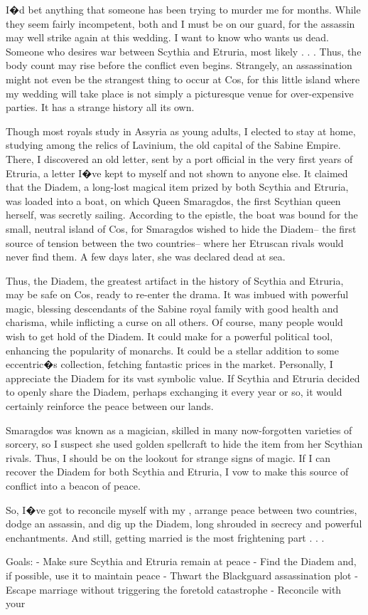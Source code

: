 \documentclass[char]{Kos}
\begin{document}
I�d bet anything that someone has been trying to murder me for months. While they seem fairly incompetent, both \cBride{\nickname} and I must be on our guard, for the assassin may well strike again at this wedding. I want to know who wants us dead. Someone who desires war between Scythia and Etruria, most likely . . . Thus, the body count may rise before the conflict even begins. Strangely, an assassination might not even be the strangest thing to occur at Cos, for this little island where my wedding will take place is not simply a picturesque venue for over-expensive parties. It has a strange history all its own.

Though most royals study in Assyria as young adults, I elected to stay at home, studying among the relics of Lavinium, the old capital of the Sabine Empire. There, I discovered an old letter, sent by a port official in the very first years of Etruria, a letter I�ve kept to myself and not shown to anyone else. It claimed that the Diadem, a long-lost magical item prized by both Scythia and Etruria, was loaded into a boat, on which Queen Smaragdos, the first Scythian queen herself, was secretly sailing. According to the epistle, the boat was bound for the small, neutral island of Cos, for Smaragdos wished to hide the Diadem-- the first source of tension between the two countries-- where her Etruscan rivals would never find them. A few days later, she was declared dead at sea.

Thus, the Diadem, the greatest artifact in the history of Scythia and Etruria, may be safe on Cos, ready to re-enter the drama. It was imbued with powerful magic, blessing descendants of the Sabine royal family with good health and charisma, while inflicting a curse on all others. Of course, many people would wish to get hold of the Diadem. It could make for a powerful political tool, enhancing the popularity of monarchs. It could be a stellar addition to some eccentric�s collection, fetching fantastic prices in the market. Personally, I appreciate the Diadem for its vast symbolic value. If Scythia and Etruria decided to openly share the Diadem, perhaps exchanging it every year or so, it would certainly reinforce the peace between our lands.

Smaragdos was known as a magician, skilled in many now-forgotten varieties of sorcery, so I suspect she used golden spellcraft to hide the item from her Scythian rivals. Thus, I should be on the lookout for strange signs of magic. If I can recover the Diadem for both Scythia and Etruria, I vow to make this source of conflict into a beacon of peace. 

So, I�ve got to reconcile myself with my \cPoet{\sibling}, arrange peace between two countries, dodge an assassin, and dig up the Diadem, long shrouded in secrecy and powerful enchantments. And still, getting married is the most frightening part . . .

Goals:
- Make sure Scythia and Etruria remain at peace
- Find the Diadem and, if possible, use it to maintain peace
- Thwart the Blackguard assassination plot 
- Escape marriage without triggering the foretold catastrophe
- Reconcile with your \cPoet{\sibling}
\end{document}
